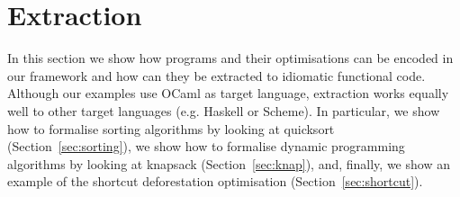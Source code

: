 \documentclass[a4paper,UKenglish,cleveref, autoref, thm-restate]{lipics-v2021}
\newcommand{\mvol}[1]{\textcolor{blue}{\textsc{Michael}: #1}}
\begin{document}
\section{Extraction}
\label{sec:extraction}
In this section we show how programs and their optimisations can be encoded in
our framework and how can they be extracted to idiomatic functional code.
Although our examples use OCaml as target language, extraction works equally
well to other target languages (e.g. Haskell or Scheme). In particular, we show
how to formalise sorting algorithms by looking at quicksort
(Section~\ref{sec:sorting}), we show how to formalise dynamic programming
algorithms by looking at knapsack (Section~\ref{sec:knap}), and, finally, we
show an example of the shortcut deforestation optimisation
(Section~\ref{sec:shortcut}).
\end{document}
